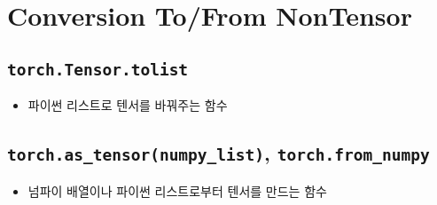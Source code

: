 \documentclass{article}
\begin{document}
\section*{Conversion To/From NonTensor}
\subsection*{\texttt{torch.Tensor.tolist}}
\begin{itemize}
  \item 파이썬 리스트로 텐서를 바꿔주는 함수
\end{itemize}

\subsection*{\texttt{torch.as\_tensor(numpy\_list)}, \texttt{torch.from\_numpy}}
\begin{itemize}
  \item 넘파이 배열이나 파이썬 리스트로부터 텐서를 만드는 함수
\end{itemize}
\end{document}
